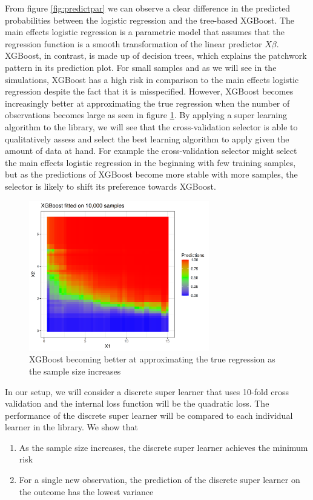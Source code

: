\documentclass[11pt, a4paper]{article}
\theoremstyle{definition}
\theoremstyle{remark}
\begin{document}
From figure \ref{fig:predictpar} we can observe a clear difference in the predicted probabilities between the logistic regression and the tree-based XGBoost. The main effects logistic regression is a parametric model that assumes that the regression function is a smooth transformation of the linear predictor $ X\beta $. XGBoost, in contrast, is made up of decision trees, which explains the patchwork pattern in its prediction plot. For small samples and as we will see in the simulations, XGBoost has a high risk in comparison to the main effects logistic regression despite the fact that it is misspecified. However, XGBoost becomes increasingly better at approximating the true regression when the number of observations becomes large as seen in figure \ref{fig:xgboost10k}. By applying a super learning algorithm to the library, we will see that the cross-validation selector is able to qualitatively assess and select the best learning algorithm to apply given the amount of data at hand. For example the cross-validation selector might select the main effects logistic regression in the beginning with few training samples, but as the predictions of XGBoost become more stable with more samples, the selector is likely to shift its preference towards XGBoost.  
\begin{figure}[H]
    \centering
    \includegraphics[width=0.7\textwidth]{figures/xgboost10k.png}
    \caption{XGBoost becoming better at approximating the true regression as the sample size increases}
    \label{fig:xgboost10k}
\end{figure}
In our setup, we will consider a discrete super learner that uses 10-fold cross validation and the internal loss function will be the quadratic loss. The performance of the discrete super learner will be compared to each individual learner in the library. We show that
\begin{enumerate}
    \item As the sample size increases, the  discrete super learner achieves the minimum risk 
    \item For a single new observation, the prediction of the discrete super learner on the outcome has the lowest variance
\end{enumerate}
\end{document}
